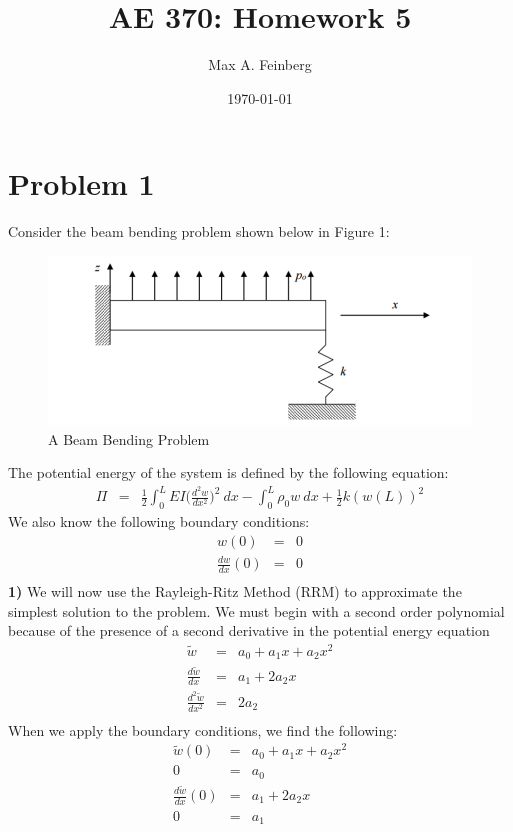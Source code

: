 \documentclass[a4paper]{article}
\title{AE 370: Homework 5}
\author{Max A. Feinberg}
\date{\AdvanceDate[-1]\today}
\begin{document}
\maketitle

\section*{Problem 1}
Consider the beam bending problem shown below in Figure 1:

\begin{figure}[ht]
\centering
\includegraphics[scale=1.0]{AE370HW5.PNG}
\caption{A Beam Bending Problem}
\end{figure}
The potential energy of the system is defined by the following equation: 
\begin{eqnarray*}
\Pi & = & \frac{1}{2} \int_{0}^{L}EI\Big(\frac{d^{2}w}{dx^{2}}\Big)^{2} \ dx - \int_{0}^{L}\rho_{0}w \ dx + \frac{1}{2} k(w(L))^{2} 
\end{eqnarray*}
We also know the following boundary conditions:
\begin{eqnarray*}
w(0) & = & 0\\
\frac{dw}{dx}(0) & = & 0\\
\end{eqnarray*}
\textbf{1)} We will now use the Rayleigh-Ritz Method (RRM) to approximate the simplest solution to the problem.  We must begin with a second order polynomial because of the presence of a second derivative in the potential energy equation
\begin{eqnarray*}
\widetilde{w} & = & a_0 + a_{1}x + a_{2}x^{2}\\
\frac{d\tilde{w}}{dx} & = & a_{1} + 2a_{2}x\\
\frac{d^{2}\tilde{w}}{dx^{2}} & = & 2a_{2}\\
\end{eqnarray*}
When we apply the boundary conditions, we find the following:
\begin{eqnarray*}
\widetilde{w}(0) & = & a_0 + a_{1}x + a_{2}x^{2}\\
0 & = & a_{0}\\
\frac{d\tilde{w}}{dx} (0) & = & a_{1} + 2a_{2}x\\
0 & = & a_{1}\\
\end{eqnarray*}
\end{document}
